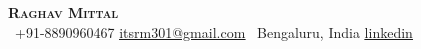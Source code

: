 \begin{center}
    \textbf{\Huge \scshape Raghav Mittal} \\ \vspace{4pt}
     \ \small +91-8890960467 \quad
    \href{mailto:itsrm301@gmail.com}{ \underline{itsrm301@gmail.com}} \quad
     \ \small Bengaluru, India \quad
    \href{https://www.linkedin.com/in/raghav-mittal-bb3b26213/}{ \underline{linkedin}}
\end{center}
